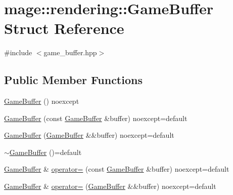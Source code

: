 \hypertarget{structmage_1_1rendering_1_1_game_buffer}{}\section{mage\+:\+:rendering\+:\+:Game\+Buffer Struct Reference}
\label{structmage_1_1rendering_1_1_game_buffer}


{\ttfamily \#include $<$game\+\_\+buffer.\+hpp$>$}

\subsection*{Public Member Functions}
\begin{DoxyCompactItemize}
\item 
\hyperlink{structmage_1_1rendering_1_1_game_buffer_ad38868666dffd8967a04e87a6ff9ebc5}{Game\+Buffer} () noexcept
\item 
\hyperlink{structmage_1_1rendering_1_1_game_buffer_ad7cd514cc0c422bce555f8435a06d7d0}{Game\+Buffer} (const \hyperlink{structmage_1_1rendering_1_1_game_buffer}{Game\+Buffer} \&buffer) noexcept=default
\item 
\hyperlink{structmage_1_1rendering_1_1_game_buffer_a4f151da7c4b17426f9293d72f3621583}{Game\+Buffer} (\hyperlink{structmage_1_1rendering_1_1_game_buffer}{Game\+Buffer} \&\&buffer) noexcept=default
\item 
\hyperlink{structmage_1_1rendering_1_1_game_buffer_a7cf8e2d277f99d447af729a6a92fe572}{$\sim$\+Game\+Buffer} ()=default
\item 
\hyperlink{structmage_1_1rendering_1_1_game_buffer}{Game\+Buffer} \& \hyperlink{structmage_1_1rendering_1_1_game_buffer_a44db86bb85f9fcf7dea1345ed9416aa3}{operator=} (const \hyperlink{structmage_1_1rendering_1_1_game_buffer}{Game\+Buffer} \&buffer) noexcept=default
\item 
\hyperlink{structmage_1_1rendering_1_1_game_buffer}{Game\+Buffer} \& \hyperlink{structmage_1_1rendering_1_1_game_buffer_a3fec557a6d2f02eaf2082caa59b5e310}{operator=} (\hyperlink{structmage_1_1rendering_1_1_game_buffer}{Game\+Buffer} \&\&buffer) noexcept=default
\end{DoxyCompactItemize}
